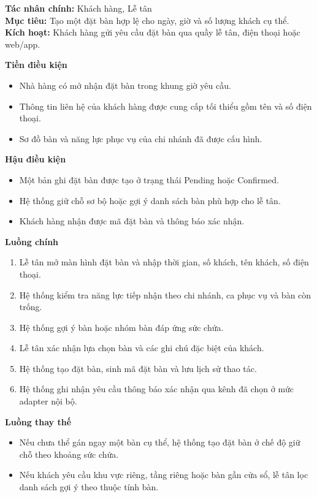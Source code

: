 \documentclass[11pt,a4paper]{article}
\begin{document}
    \begin{usecasebox}[title={UC-RES-01 --- Tạo đặt bàn}]
    \textbf{Tác nhân chính:} Khách hàng, Lễ tân\\
    \textbf{Mục tiêu:} Tạo một đặt bàn hợp lệ cho ngày, giờ và số lượng khách cụ thể.\\
    \textbf{Kích hoạt:} Khách hàng gửi yêu cầu đặt bàn qua quầy lễ tân, điện thoại hoặc web/app.

    \medskip
    \textbf{Tiền điều kiện}
    \begin{itemize}[leftmargin=1.8em]
  \item Nhà hàng có mở nhận đặt bàn trong khung giờ yêu cầu.
  \item Thông tin liên hệ của khách hàng được cung cấp tối thiểu gồm tên và số điện thoại.
  \item Sơ đồ bàn và năng lực phục vụ của chi nhánh đã được cấu hình.
\end{itemize}

    \textbf{Hậu điều kiện}
    \begin{itemize}[leftmargin=1.8em]
  \item Một bản ghi đặt bàn được tạo ở trạng thái \textsf{Pending} hoặc \textsf{Confirmed}.
  \item Hệ thống giữ chỗ sơ bộ hoặc gợi ý danh sách bàn phù hợp cho lễ tân.
  \item Khách hàng nhận được mã đặt bàn và thông báo xác nhận.
\end{itemize}

    \textbf{Luồng chính}
    \begin{enumerate}[leftmargin=1.8em]
  \item Lễ tân mở màn hình đặt bàn và nhập thời gian, số khách, tên khách, số điện thoại.
  \item Hệ thống kiểm tra năng lực tiếp nhận theo chi nhánh, ca phục vụ và bàn còn trống.
  \item Hệ thống gợi ý bàn hoặc nhóm bàn đáp ứng sức chứa.
  \item Lễ tân xác nhận lựa chọn bàn và các ghi chú đặc biệt của khách.
  \item Hệ thống tạo đặt bàn, sinh mã đặt bàn và lưu lịch sử thao tác.
  \item Hệ thống ghi nhận yêu cầu thông báo xác nhận qua kênh đã chọn ở mức adapter nội bộ.
\end{enumerate}

    \textbf{Luồng thay thế}
    \begin{itemize}[leftmargin=1.8em]
  \item Nếu chưa thể gán ngay một bàn cụ thể, hệ thống tạo đặt bàn ở chế độ giữ chỗ theo khoảng sức chứa.
  \item Nếu khách yêu cầu khu vực riêng, tầng riêng hoặc bàn gần cửa sổ, lễ tân lọc danh sách gợi ý theo thuộc tính bàn.
\end{itemize}


\end{usecasebox}
\end{document}
